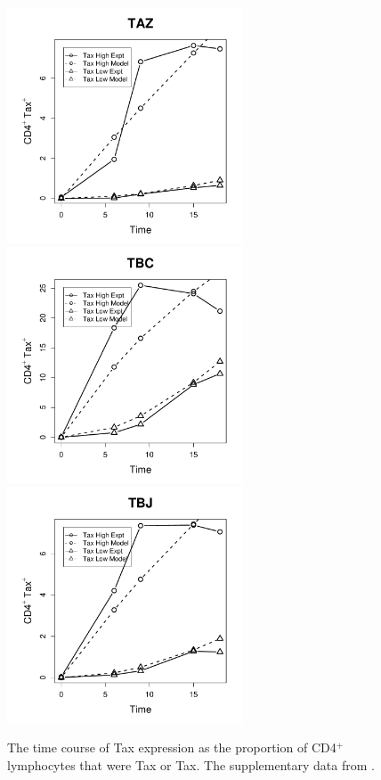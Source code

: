 \begin{figure}[htp]
\hspace{0cm}%
\includegraphics[width=7cm]{./Figures/chapter5/figure_timecourse_taz} \\
\includegraphics[width=7cm]{./Figures/chapter5/figure_timecourse_tbc}%
\hspace{0cm}%
\includegraphics[width=7cm]{./Figures/chapter5/figure_timecourse_tbj} \\
\caption[The Tax expression time course: other patients]{The time course of Tax expression as the proportion of CD4$^+$ lymphocytes that were Tax or Tax. The supplementary data from .}
\label{appendixb/figureTimecourse}
\end{figure}

